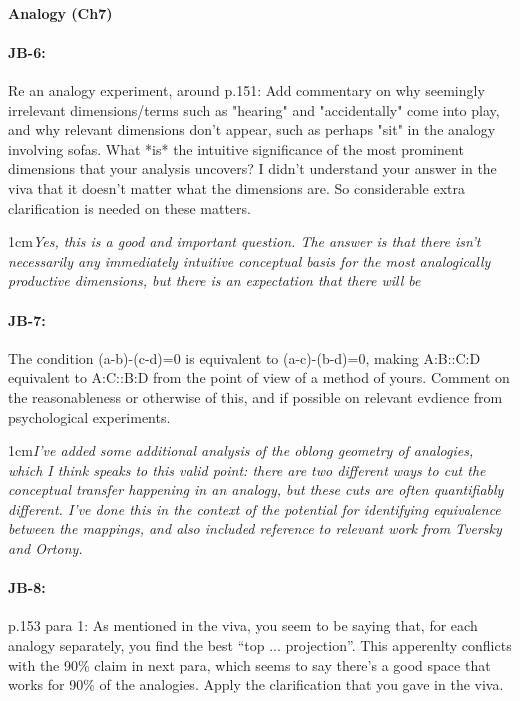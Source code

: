 \documentclass[11pt,a4paper]{article}
\newcommand{\res}[1]{\vspace{0.25cm} \begin{adjustwidth}{1cm}{}\emph{#1}\end{adjustwidth}}
\begin{document}
\paragraph{Analogy  (Ch7)}

\paragraph{JB-6:} Re an analogy experiment, around p.151: Add commentary on why seemingly irrelevant dimensions/terms such as "hearing" and "accidentally" come into play, and why relevant dimensions don't appear, such as perhaps "sit" in the analogy involving sofas. What *is* the intuitive significance of the most prominent dimensions that your analysis uncovers? I didn't understand your answer in the viva that it doesn't matter what the dimensions are. So considerable extra clarification is needed on these matters.

\res{Yes, this is a good and important question.  The answer is that there isn't necessarily any immediately intuitive conceptual basis for the most analogically productive dimensions, but there is an expectation that there will be }

\paragraph{JB-7:} The condition (a-b)-(c-d)=0 is equivalent to (a-c)-(b-d)=0, making A:B::C:D equivalent to A:C::B:D from the point of view of a method of yours. Comment on the reasonableness or otherwise of this, and if possible on relevant evdience from psychological experiments.

\res{I've added some additional analysis of the oblong geometry of analogies, which I think speaks to this valid point: there are two different ways to cut the conceptual transfer happening in an analogy, but these cuts are often quantifiably different.  I've done this in the context of the potential for identifying equivalence between the mappings, and also included reference to relevant work from Tversky and Ortony.}

\paragraph{JB-8:} p.153 para 1: As mentioned in the viva, you seem to be saying that, for each analogy separately, you find the best ``top ... projection''. This apperenlty conflicts with the 90\% claim in next para, which seems to say there's a good space that works for 90\% of the analogies. Apply the clarification that you gave in the viva.
\end{document}
